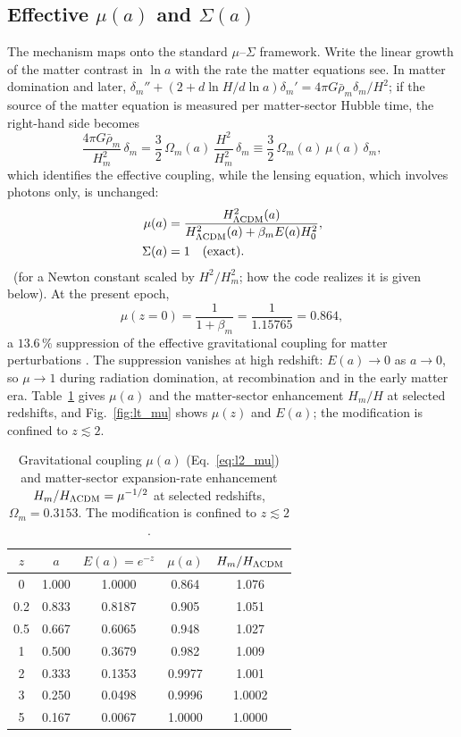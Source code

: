 \subsection{Effective $\mu(a)$ and $\Sigma(a)$}
The mechanism maps onto the standard $\mu$--$\Sigma$ framework. Write the linear growth of the matter contrast in $\ln a$ with the rate the matter
equations see. In matter domination and later, $\delta_m''+(2+d\ln H/d\ln a)\delta_m'=4\pi G\bar\rho_m\delta_m/H^2$; if the source of the matter
equation is measured per matter-sector Hubble time, the right-hand side becomes
\begin{equation}
\frac{4\pi G\bar\rho_m}{H_m^2}\,\delta_m=\frac32\,\Omega_m(a)\,\frac{H^2}{H_m^2}\,\delta_m\equiv\frac32\,\Omega_m(a)\,\mu(a)\,\delta_m ,
\end{equation}
which identifies the effective coupling, while the lensing equation, which involves photons only, is unchanged:
\begin{align}
\mu(a)&=\frac{H^2_{\Lambda\rm CDM}(a)}{H^2_{\Lambda\rm CDM}(a)+\beta_mE(a)H_0^2},\label{eq:l2_mu}\\
\Sigma(a)&=1\quad\text{(exact)}.\label{eq:l2_sigma}
\end{align}
\derived\ (for a Newton constant scaled by $H^2/H_m^2$; how the code realizes it is given below). At the present epoch,
\begin{equation}
\mu(z{=}0)=\frac{1}{1+\beta_m}=\frac{1}{1.15765}=0.864,
\label{eq:l2_mu0}\end{equation}
a $13.6\,\%$ suppression of the effective gravitational coupling for matter perturbations \calc. The suppression vanishes at high redshift: $E(a)\to0$
as $a\to0$, so $\mu\to1$ during radiation domination, at recombination and in the early matter era. Table~\ref{tab:l2_mu} gives $\mu(a)$ and the
matter-sector enhancement $H_m/H$ at selected redshifts, and Fig.~\ref{fig:lt_mu} shows $\mu(z)$ and $E(a)$; the modification is confined to
$z\lesssim2$.

\begin{table}[htbp]\centering\small
\caption{Gravitational coupling $\mu(a)$ (Eq.~\ref{eq:l2_mu}) and matter-sector expansion-rate enhancement $H_m/H_{\Lambda\rm CDM}=\mu^{-1/2}$ at
selected redshifts, $\Omega_m=0.3153$. The modification is confined to $z\lesssim2$. \calc}\label{tab:l2_mu}
\begin{tabular}{ccccc}\hline
$z$ & $a$ & $E(a)=e^{-z}$ & $\mu(a)$ & $H_m/H_{\Lambda\rm CDM}$\\\hline
0 & 1.000 & 1.0000 & 0.864 & 1.076\\
0.2 & 0.833 & 0.8187 & 0.905 & 1.051\\
0.5 & 0.667 & 0.6065 & 0.948 & 1.027\\
1 & 0.500 & 0.3679 & 0.982 & 1.009\\
2 & 0.333 & 0.1353 & 0.9977 & 1.001\\
3 & 0.250 & 0.0498 & 0.9996 & 1.0002\\
5 & 0.167 & 0.0067 & 1.0000 & 1.0000\\\hline
\end{tabular}\end{table}

